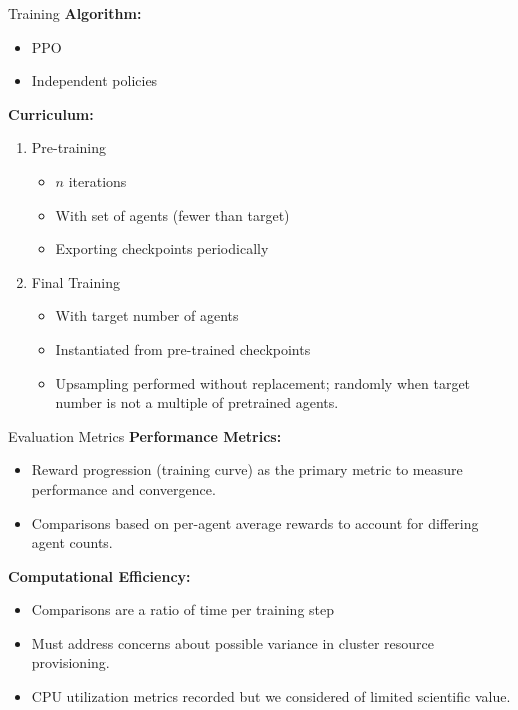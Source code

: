 \begin{frame}{Training}
    \textbf{Algorithm:}
    \begin{itemize}
        \item PPO
        \item Independent policies
    \end{itemize}

    \textbf{Curriculum:}
    \begin{enumerate}
        \item Pre-training
        \begin{itemize}
            \item $n$ iterations
            \item With set of agents (fewer than target)
            \item Exporting checkpoints periodically
        \end{itemize}
        \item Final Training
        \begin{itemize}
            \item With target number of agents
            \item Instantiated from pre-trained checkpoints
            \item Upsampling performed without replacement; 
                randomly when target number is not a multiple of pretrained agents.
        \end{itemize}
    \end{enumerate}
\end{frame}


\begin{frame}{Evaluation Metrics}
    \textbf{Performance Metrics:}
    \begin{itemize}
        \item Reward progression (training curve) as the primary metric to measure performance and convergence.
        \item Comparisons based on per-agent average rewards to account for differing agent counts.
    \end{itemize}

    \textbf{Computational Efficiency:}
    \begin{itemize}
        \item Comparisons are a ratio of time per training step
        \item Must address concerns about possible variance in cluster resource provisioning.
        \item CPU utilization metrics recorded but we considered of limited scientific value.
    \end{itemize}
\end{frame}

